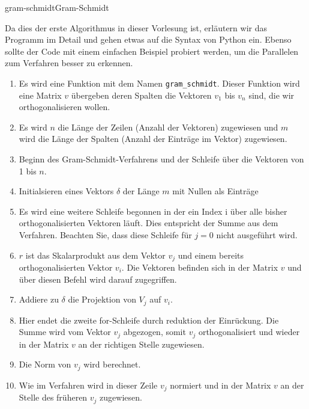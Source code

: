 \begin{Algorithmus*}{gram-schmidt}{Gram-Schmidt}
  
\end{Algorithmus*}

\begin{intro}
  Da dies der erste Algorithmus in dieser Vorlesung ist, erläutern wir
  das Programm im Detail und gehen etwas auf die Syntax von Python
  ein. Ebenso sollte der Code mit einem einfachen Beispiel
  probiert werden, um die Parallelen zum Verfahren besser zu erkennen.
  \begin{enumerate}
  \item Es wird eine Funktion mit dem Namen
    \lstinline!gram_schmidt!. Dieser Funktion wird eine Matrix $v$
    übergeben deren Spalten die Vektoren $v_1$ bis $v_n$ sind, die wir
    orthogonalisieren wollen.
  \item Es wird $n$ die Länge der Zeilen (Anzahl der Vektoren)
    zugewiesen und $m$ wird die Länge der Spalten (Anzahl der Einträge
    im Vektor) zugewiesen.
  \item Beginn des Gram-Schmidt-Verfahrens und der Schleife über die
    Vektoren von 1 bis $n$.
   \item Initialsieren eines Vektors $\delta$ der Länge $m$ mit Nullen als Einträge
   \item Es wird eine weitere Schleife begonnen in der ein Index i
     über alle bisher orthogonalisierten Vektoren läuft. Dies
     entspricht der Summe aus dem Verfahren. Beachten Sie, dass diese
     Schleife für $j=0$ nicht ausgeführt wird.
   \item $r$ ist das Skalarprodukt aus dem Vektor $v_j$ und einem
     bereits orthogonalisierten Vektor $v_i$.  Die Vektoren befinden sich in
     der Matrix $v$ und über diesen Befehl wird darauf zugegriffen.
   \item Addiere zu $\delta$ die Projektion von $V_j$ auf $v_i$.
   \item Hier endet die zweite for-Schleife durch reduktion der
     Einrückung.  Die Summe wird vom Vektor $v_j$ abgezogen, somit
     $v_j$ orthogonalisiert und wieder in der Matrix $v$ an der
     richtigen Stelle zugewiesen.
   \item  Die Norm von $v_j$ wird berechnet.  
   \item Wie im Verfahren wird in  dieser Zeile $v_j$ normiert und in der Matrix $v$ an der Stelle des
       früheren $v_j$ zugewiesen.
  \end{enumerate}
\end{intro}

